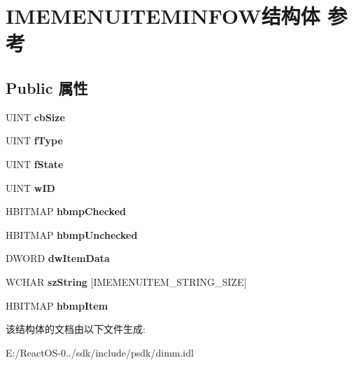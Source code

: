 \hypertarget{struct_i_m_e_m_e_n_u_i_t_e_m_i_n_f_o_w}{}\section{I\+M\+E\+M\+E\+N\+U\+I\+T\+E\+M\+I\+N\+F\+O\+W结构体 参考}
\label{struct_i_m_e_m_e_n_u_i_t_e_m_i_n_f_o_w}
\subsection*{Public 属性}
\begin{DoxyCompactItemize}
\item 
\mbox{\label{struct_i_m_e_m_e_n_u_i_t_e_m_i_n_f_o_w_a2fdd4f904d85f5403720f3fc476ab187}} 
U\+I\+NT {\bfseries cb\+Size}
\item 
\mbox{\label{struct_i_m_e_m_e_n_u_i_t_e_m_i_n_f_o_w_aa614a72517c1bc6f131447a30ba4b820}} 
U\+I\+NT {\bfseries f\+Type}
\item 
\mbox{\label{struct_i_m_e_m_e_n_u_i_t_e_m_i_n_f_o_w_a8e49c8d5ac1581a2bdfd1584f9587c7c}} 
U\+I\+NT {\bfseries f\+State}
\item 
\mbox{\label{struct_i_m_e_m_e_n_u_i_t_e_m_i_n_f_o_w_a80c27f63135b62d4db52aba80d8e07af}} 
U\+I\+NT {\bfseries w\+ID}
\item 
\mbox{\label{struct_i_m_e_m_e_n_u_i_t_e_m_i_n_f_o_w_af9a8fed2c51efe01cfef9659a6ebcf13}} 
H\+B\+I\+T\+M\+AP {\bfseries hbmp\+Checked}
\item 
\mbox{\label{struct_i_m_e_m_e_n_u_i_t_e_m_i_n_f_o_w_a2c7787241cc0f605a5f53e1992c5fd50}} 
H\+B\+I\+T\+M\+AP {\bfseries hbmp\+Unchecked}
\item 
\mbox{\label{struct_i_m_e_m_e_n_u_i_t_e_m_i_n_f_o_w_af061cf431337f87fb371f5c8a147fce1}} 
D\+W\+O\+RD {\bfseries dw\+Item\+Data}
\item 
\mbox{\label{struct_i_m_e_m_e_n_u_i_t_e_m_i_n_f_o_w_a0b4f04654298cc38576412ebb844487d}} 
W\+C\+H\+AR {\bfseries sz\+String} \mbox{[}I\+M\+E\+M\+E\+N\+U\+I\+T\+E\+M\+\_\+\+S\+T\+R\+I\+N\+G\+\_\+\+S\+I\+ZE\mbox{]}
\item 
\mbox{\label{struct_i_m_e_m_e_n_u_i_t_e_m_i_n_f_o_w_a999f6707826a761a0a42625fd512102d}} 
H\+B\+I\+T\+M\+AP {\bfseries hbmp\+Item}
\end{DoxyCompactItemize}


该结构体的文档由以下文件生成\+:\begin{DoxyCompactItemize}
\item 
E\+:/\+React\+O\+S-\/0../sdk/include/psdk/dimm.\+idl\end{DoxyCompactItemize}
